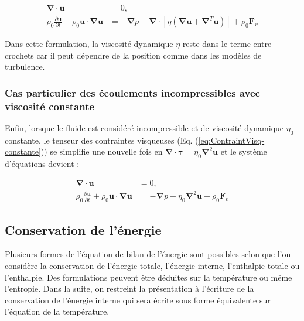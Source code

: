\begin{subequations}

\begin{align}
\boldsymbol{\nabla}\cdot\mathbf{u} & =0,\label{eq:ContinuiteMP-1}\\
\rho_{0}\frac{\partial\mathbf{u}}{\partial t}+\rho_{0}\mathbf{u}\cdot\boldsymbol{\nabla}\mathbf{u} & =-\boldsymbol{\nabla}p+\boldsymbol{\nabla}\cdot\left[\eta(\boldsymbol{\nabla}\mathbf{u}+\boldsymbol{\nabla}^{T}\mathbf{u})\right]+\rho_{0}\mathbf{F}_{v}\label{eq:DBF-1-1}
\end{align}


\end{subequations}

Dans cette formulation, la viscosit\'e dynamique $\eta$ reste dans
le terme entre crochets car il peut d\'ependre de la position comme
dans les mod\`eles de turbulence.


\subsubsection{Cas particulier des \'ecoulements incompressibles avec viscosit\'e constante}

Enfin, lorsque le fluide est consid\'er\'e incompressible et de viscosit\'e
dynamique $\eta_{0}$ constante, le tenseur des contraintes visqueuses
(Eq. (\ref{eq:ContraintVisq-constante})) se simplifie une nouvelle
fois en $\boldsymbol{\nabla}\cdot\boldsymbol{\tau}=\eta_{0}\boldsymbol{\nabla}^{2}\mathbf{u}$
et le syst\`eme d'\'equations devient :

\begin{subequations}

\begin{align}
\boldsymbol{\nabla}\cdot\mathbf{u} & =0,\label{eq:ContinuiteMP}\\
\rho_{0}\frac{\partial\mathbf{u}}{\partial t}+\rho_{0}\mathbf{u}\cdot\boldsymbol{\nabla}\mathbf{u} & =-\boldsymbol{\nabla}p+\eta_{0}\boldsymbol{\nabla}^{2}\mathbf{u}+\rho_{0}\mathbf{F}_{v}\label{eq:DBF-1}
\end{align}


\end{subequations}


\subsection{Conservation de l'\'energie}

Plusieurs formes de l'\'equation de bilan de l'\'energie sont possibles
selon que l'on consid\`ere la conservation de l'\'energie totale, l'\'energie
interne, l'enthalpie totale ou l'enthalpie. Des formulations peuvent
\^etre d\'eduites sur la temp\'erature ou m\^eme l'entropie. Dans la suite,
on restreint la pr\'esentation \`a l'\'ecriture de la conservation de l'\'energie
interne qui sera \'ecrite sous forme \'equivalente sur l'\'equation de la
temp\'erature.

